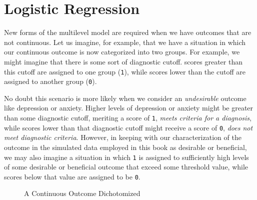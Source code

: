 \documentclass[
  letterpaper,
  DIV=11,
  numbers=noendperiod]{scrreprt}
\begin{document}

\chapter{Logistic Regression}\label{logistic-regression}

New forms of the multilevel model are required when we have outcomes
that are not continuous. Let us imagine, for example, that we have a
situation in which our continuous outcome is now categorized into two
groups. For example, we might imagine that there is some sort of
diagnostic cutoff. scores greater than this cutoff are assigned to one
group (\texttt{1}), while scores lower than the cutoff are assigned to
another group (\texttt{0}).

No doubt this scenario is more likely when we consider an
\emph{undesirable} outcome like depression or anxiety. Higher levels of
depression or anxiety might be greater than some diagnostic cutoff,
meriting a score of \texttt{1}, \emph{meets criteria for a diagnosis},
while scores lower than that diagnostic cutoff might receive a score of
\texttt{0}, \emph{does not meet diagnostic criteria}. However, in
keeping with our characterization of the outcome in the simulated data
employed in this book as desirable or beneficial, we may also imagine a
situation in which \texttt{1} is assigned to sufficiently high levels of
some desirable or beneficial outcome that exceed some threshold value,
while scores below that value are assigned to be \texttt{0}.

\begin{figure}


\caption{\label{fig-dichotomized}A Continuous Outcome Dichotomized}

\end{figure}%
\end{document}
